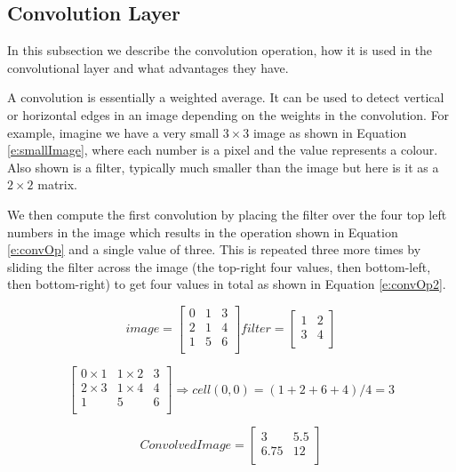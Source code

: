 \documentclass{bhamthesis}
\theoremstyle{definition}
\begin{document}
\subsection{Convolution Layer}
In this subsection we describe the convolution operation, how it is used in the convolutional layer and what advantages they have.

A convolution is essentially a weighted average. It can be used to detect vertical or horizontal edges in an image depending on the weights in the convolution. For example, imagine we have a very small $3 \times 3$ image as shown in Equation \ref{e:smallImage}, where each number is a pixel and the value represents a colour. Also shown is a filter, typically much smaller than the image but here is it as a $2 \times 2$ matrix.

We then compute the first convolution by placing the filter over the four top left numbers in the image which results in the operation shown in Equation \ref{e:convOp} and a single value of three. This is repeated three more times by sliding the filter across the image (the top-right four values, then bottom-left, then bottom-right) to get four values in total as shown in Equation \ref{e:convOp2}.

\begin{equation}\label{e:smallImage}
image = 
\left[ \begin{array}{ccc}
0 & 1 & 3 \\
2 & 1 & 4 \\
1 & 5 & 6 \\
\end{array}\right]
filter = 
\left[\begin{array}{cc}
1 & 2 \\
3 & 4 \\
\end{array}\right]
\end{equation}

\begin{equation}\label{e:convOp}
\left[\begin{array}{ccc}
0 \times 1 & 1 \times 2 & 3 \\
2 \times3 & 1 \times 4 & 4 \\
1 & 5 & 6 \\
\end{array}\right]
\Rightarrow
cell(0,0) = (1+2+6+4)/4 = 3
\end{equation}

\begin{equation}\label{e:convOp2}
Convolved Image=
\left[\begin{array}{cc}
3 & 5.5 \\
6.75 & 12 \\
\end{array}\right]
\end{equation}
\end{document}
